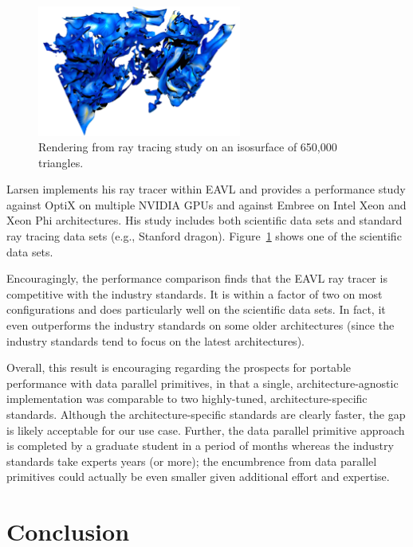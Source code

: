\documentclass{superfri}
\begin{document}
\begin{figure}
  \includegraphics[width=2.64in]{images/rm650_teaser}
  \caption{Rendering from ray tracing study on an isosurface of 650,000 triangles.\\}
  \label{fig:raytracing}
  \vspace{-\baselineskip}
\end{figure}
Larsen implements his ray tracer within EAVL and provides a performance
study against OptiX on multiple NVIDIA GPUs and against Embree on Intel Xeon
and Xeon Phi architectures.  
%
His study includes both scientific data sets and standard
ray tracing data sets (e.g., Stanford dragon).
%
Figure~\ref{fig:raytracing} shows one of the scientific data sets.

Encouragingly, the performance comparison finds that the EAVL
ray tracer is competitive with the industry standards.
%
It is within a factor of two on most configurations and does particularly
well on the scientific data sets.
%
In fact, it even outperforms the industry standards on some older
architectures (since the industry standards tend to focus on 
the latest architectures).
%

Overall, this result is encouraging regarding the prospects for portable
performance with data parallel primitives, in that 
a single, architecture-agnostic implementation was comparable to two 
highly-tuned, architecture-specific standards.
%
Although the architecture-specific standards are clearly faster, the gap
is likely acceptable for our use case.
%
Further, the data parallel primitive approach is completed by a graduate
student in a period of months whereas the industry standards take
experts years (or more); the encumbrence from data parallel
primitives could actually be even smaller given additional effort and expertise.

\section{Conclusion}
\end{document}
